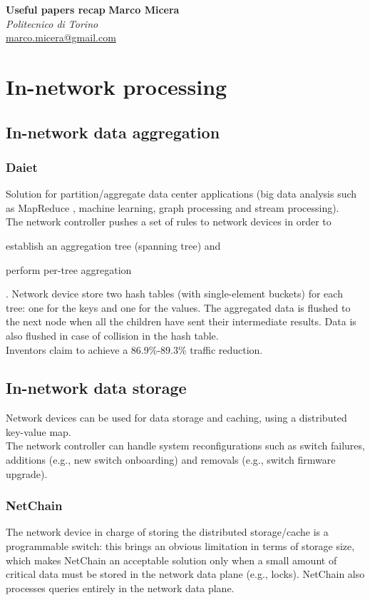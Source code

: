 \documentclass[a4paper, 11pt]{article}
\begin{document}
\noindent
\Large{\textbf{Useful papers recap}} \hfill \large{\textbf{Marco Micera}} \\
\normalsize \phantom{Notes on papers that might be useful} \hfill \textit{Politecnico di Torino} \\
\normalsize \phantom{for the development of this thesis} \hfill \href{mailto:marco.micera@gmail.com}{marco.micera@gmail.com}

\section{In-network processing}
\subsection{In-network data aggregation}
\subsubsection{Daiet \cite{daiet}}
Solution for partition/aggregate data center applications (big data analysis such as MapReduce \cite{mapreduce}, machine learning, graph processing and stream processing).\\
The network controller pushes a set of rules to network devices in order to
\begin{mylist}
    \item establish an aggregation tree (spanning tree) and
    \item perform per-tree aggregation
\end{mylist}. Network device store two hash tables (with single-element buckets) for each tree: one for the keys and one for the values. The aggregated data is flushed to the next node when all the children have sent their intermediate results. Data is also flushed in case of collision in the hash table.\\
Inventors claim to achieve a 86.9\%-89.3\% traffic reduction.

\subsection{In-network data storage}
Network devices can be used for data storage and caching, using a distributed key-value map.\\
The network controller can handle system reconfigurations such as switch failures, additions (e.g., new switch onboarding) and removals (e.g., switch firmware upgrade).
\subsubsection{NetChain \cite{netchain}}
The network device in charge of storing the distributed storage/cache is a programmable switch: this brings an obvious limitation in terms of storage size, which makes NetChain \cite{netchain} an acceptable solution only when a small amount of critical data must be stored in the network data plane (e.g., locks). NetChain \cite{netchain} also processes queries entirely in the network data plane.
\end{document}
